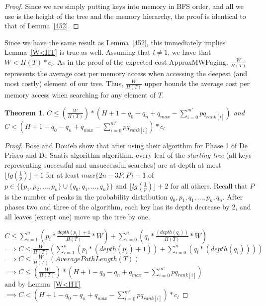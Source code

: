 \documentclass[letterpaper,12pt,titlepage,oneside,final]{book}
\theoremstyle{plain}
\newtheorem{thm}{Theorem}[section]
\begin{document}
\begin{proof}
Since we are simply putting keys into memory in BFS order, and all we use is the height of the tree and the memory hierarchy, the proof is identical to that of Lemma~\ref{452}.
\end{proof}

Since we have the same result as Lemma~\ref{452}, this immediately implies Lemma~\ref{W<HT} is true as well. Assuming that $l \neq 1$, we have that $W<H(T)*c_l$. As in the proof of the expected cost ApproxMWPaging, $\frac{W}{H(T)}$ represents the average cost per memory access when accessing the deepest (and most costly) element of our tree. Thus, $\frac{W}{H(T)}$ upper bounds the average cost per memory access when searching for any element of $T$.
\\

\begin{thm} \label{ApproxBSTThm}
$C \leq  (\frac{W}{H(T)}) * (H + 1 - q_0 - q_n + q_{max} - \sum_{i=0}^{m'} pq_{rank[i]})$ and \\
$C <  (H + 1 - q_0 - q_n + q_{max} - \sum_{i=0}^{m'} pq_{rank[i]})*c_l$
\end{thm}

\begin{proof}

Bose and Dou\"{i}eb show that after using their algorithm for Phase 1 of De Prisco and De Santis algorithm algorithm, every leaf of the \textit{starting tree} (all keys representing successful and unsuccessful searches) are at depth at most $\lfloor lg(\frac{1}{p}) \rfloor + 1$  for at least $max\{2n-3P,P\}-1$ of $p \in \{ \{p_1, p_2, ..., p_n \} \cup \{ q_0, q_1, ..., q_n \} \}$ and $\lfloor lg(\frac{1}{p}) \rfloor + 2$ for all others. Recall that $P$ is the number of peaks in the probability distribution $q_0, p_1, q_1, ..., p_n, q_n$. After phases two and three of the algorithm, each key has its depth decrease by 2, and all leaves (except one) move up the tree by one.

$C \leq \sum_{i=1}^{n}(p_i*\frac{depth(p_i)+1}{H(T)}* W)+ \sum_{i=0}^{n}(q_i*\frac{(depth(q_i))}{H(T)}* W)$ \\

$\implies C \leq \frac{W}{H(T)}(\sum_{i=1}^{n}(p_i*(depth(p_i)+1))+ \sum_{i=0}^{n}(q_i*(depth(q_i))))$ \\

$\implies C \leq \frac{W}{H(T)}(Average Path Length(T))$ \\

$\implies C \leq  (\frac{W}{H(T)}) * (H + 1 - q_0 - q_n + q_{max} - \sum_{i=0}^{m'} pq_{rank[i]})$ \\
and by Lemma~\ref{W<HT} \\
$\implies C <  (H + 1 - q_0 - q_n + q_{max} - \sum_{i=0}^{m'} pq_{rank[i]})*c_l$
\end{proof}
\end{document}
